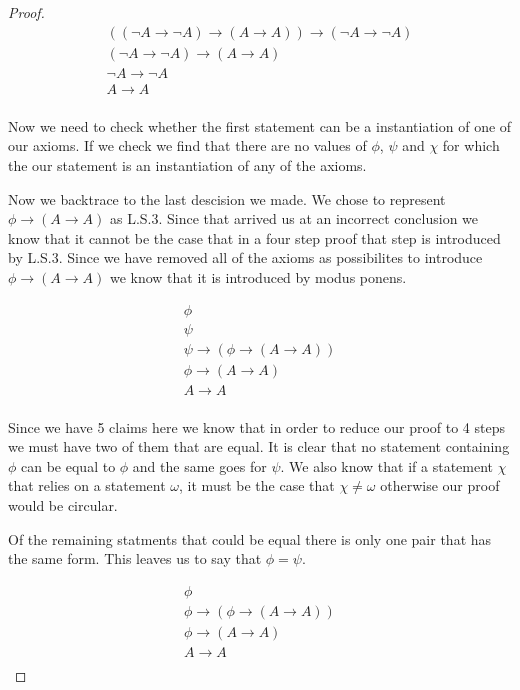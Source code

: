 \documentclass{article}
\begin{document}
\begin{proof}
\begin{gather*}
((\neg A \rightarrow \neg A) \rightarrow (A \rightarrow A)) \rightarrow (\neg A \rightarrow \neg A) \\
(\neg A \rightarrow \neg A) \rightarrow (A \rightarrow A) \tag*{L.S.3} \\
\neg A \rightarrow \neg A \tag*{Modus Ponens}\\
A \rightarrow A \tag*{Modus Ponens}\\
\end{gather*}

Now we need to check whether the first statement can be a instantiation of one of our axioms.
If we check we find that there are no values of $\phi$, $\psi$ and $\chi$ for which the our statement is an instantiation of any of the axioms.

Now we backtrace to the last descision we made.
We chose to represent $\phi \rightarrow (A \rightarrow A)$ as L.S.3.
Since that arrived us at an incorrect conclusion we know that it cannot be the case that in a four step proof that step is introduced by L.S.3.
Since we have removed all of the axioms as possibilites to introduce $\phi \rightarrow (A \rightarrow A)$  we know that it is introduced by modus ponens.

\begin{gather*}
\phi \\
\psi \\
\psi \rightarrow (\phi \rightarrow (A \rightarrow A)) \\
\phi \rightarrow (A \rightarrow A) \tag*{Modus Ponenes} \\
A \rightarrow A \tag*{Modus Ponens}\\
\end{gather*}

Since we have 5 claims here we know that in order to reduce our proof to 4 steps we must have two of them that are equal.
It is clear that no statement containing $\phi$ can be equal to $\phi$ and the same goes for $\psi$.
We also know that if a statement $\chi$ that relies on a statement $\omega$, it must be the case that $\chi \neq \omega$ otherwise our proof would be circular.

Of the remaining statments that could be equal there is only one pair that has the same form.
This leaves us to say that $\phi = \psi$. 

\begin{gather*}
\phi \\
\phi \rightarrow (\phi \rightarrow (A \rightarrow A)) \\
\phi \rightarrow (A \rightarrow A) \tag*{Modus Ponenes} \\
A \rightarrow A \tag*{Modus Ponens}\\
\end{gather*}


\end{proof}
\end{document}
